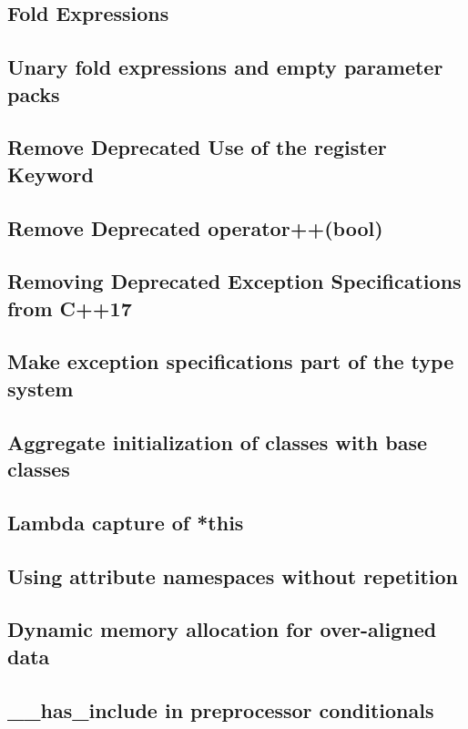 \documentclass{book}
\begin{document}
\subsection{Fold Expressions}

\subsection{Unary fold expressions and empty parameter packs}

\subsection{Remove Deprecated Use of the register Keyword}

\subsection{Remove Deprecated operator++(bool)}

\subsection{Removing Deprecated Exception Specifications from C++17}

\subsection{Make exception specifications part of the type system}

\subsection{Aggregate initialization of classes with base classes}

\subsection{Lambda capture of *this}

\subsection{Using attribute namespaces without repetition}

\subsection{Dynamic memory allocation for over-aligned data}

\subsection{\_\_has\_include in preprocessor conditionals}
\end{document}
